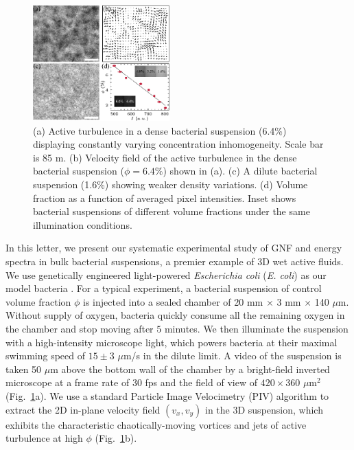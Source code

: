 \documentclass[twocolumn,aps,prl,amsmath,amssymb,longbibliography]{revtex4-2}
\begin{document}
\begin{figure}[ht]
\begin{center}
\includegraphics[width=0.47\textwidth]{Figures/experiment/v5.pdf}
\caption[Experimental details]
{
(a) Active turbulence in a dense bacterial suspension (6.4\%) displaying constantly varying concentration inhomogeneity. Scale bar is 85 \textmu m.
(b) Velocity field of the active turbulence in the dense bacterial suspension ($\phi=6.4\%$) shown in (a).
(c) A dilute bacterial suspension (1.6\%) showing weaker density variations.
(d) Volume fraction as a function of averaged pixel intensities. Inset shows bacterial suspensions of different volume fractions under the same illumination conditions.
}
\label{fig:experiment}
\end{center}
\end{figure}

In this letter, we present our systematic experimental study of GNF and energy spectra in bulk bacterial suspensions, a premier example of 3D wet active fluids. We use genetically engineered light-powered \textit{Escherichia coli} (\textit{E. coli}) as our model bacteria \cite{Liu2020}.
For a typical experiment, a bacterial suspension of control volume fraction $\phi$ is injected into a sealed chamber of 20 mm $\times$ 3 mm $\times$ 140 $\mu$m.
Without supply of oxygen, bacteria quickly consume all the remaining oxygen in the chamber and stop moving after $5$ minutes.
We then illuminate the suspension with a high-intensity microscope light, which powers bacteria at their maximal swimming speed of $15 \pm 3$ $\mu$m/s in the dilute limit.
A video of the suspension is taken 50 $\mu$m above the bottom wall of the chamber by a bright-field inverted microscope at a frame rate of $30$ fps and the field of view of $420 \times 360$ $\mu$m$^2$ (Fig.~\ref{fig:experiment}a).
We use a standard Particle Image Velocimetry (PIV) algorithm \cite{Liberzon2020} %
to extract the 2D in-plane velocity field $(v_x,v_y)$ in the 3D suspension, which exhibits the characteristic chaotically-moving vortices and jets of active turbulence at high $\phi$ (Fig.~\ref{fig:experiment}b).
\end{document}
